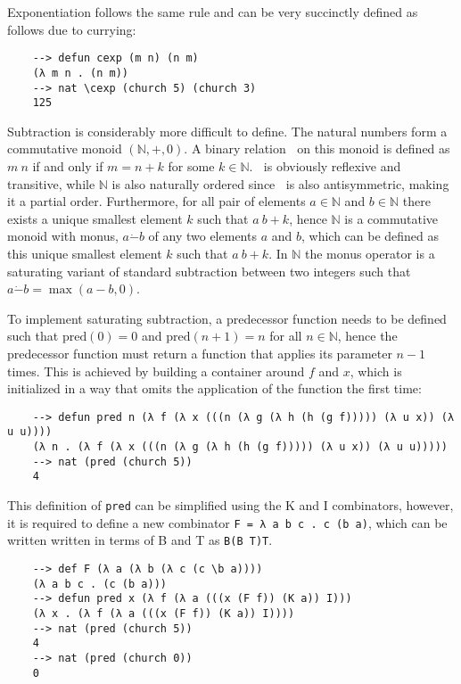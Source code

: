 Exponentiation follows the same rule and can be very succinctly defined as follows due to currying:

\begin{Verbatim}
    --> defun cexp (m n) (n m)
    (λ m n . (n m))
    --> nat \cexp (church 5) (church 3)
    125
\end{Verbatim}

Subtraction is considerably more difficult to define. The natural numbers form a commutative monoid $(\mathbb{N}, +, 0)$. A binary relation $~$ on this monoid is defined as $m~n$ if and only if $m = n + k$ for some $k \in \mathbb{N}$. $~$ is obviously reflexive and transitive, while $\mathbb{N}$ is also naturally ordered since $~$ is also antisymmetric, making it a partial order. Furthermore, for all pair of elements $a \in \mathbb{N}$ and $b \in \mathbb{N}$ there exists a unique smallest element $k$ such that $a ~ b + k$, hence $\mathbb{N}$ is a commutative monoid with monus, $a \dot - b$ of any two elements $a$ and $b$, which can be defined as this unique smallest element $k$ such that $a ~ b + k$. In $\mathbb{N}$ the monus operator is a saturating variant of standard subtraction between two integers such that $a \dot - b = \max(a - b, 0)$. 

To implement saturating subtraction, a predecessor function needs to be defined such that $\text{pred}(0) = 0$ and $\text{pred}(n + 1) = n$ for all $n \in \mathbb{N}$, hence the predecessor function must return a function that applies its parameter $n - 1$ times. This is achieved by building a container around $f$ and $x$, which is initialized in a way that omits the application of the function the first time:

\begin{Verbatim}
    --> defun pred n (λ f (λ x (((n (λ g (λ h (h (g f))))) (λ u x)) (λ u u))))
    (λ n . (λ f (λ x (((n (λ g (λ h (h (g f))))) (λ u x)) (λ u u)))))
    --> nat (pred (church 5))
    4
\end{Verbatim}

This definition of \verb|pred| can be simplified using the K and I combinators, however, it is required to define a new combinator \verb|F = λ a b c . c (b a)|, which can be written written in terms of B and T as \verb|B(B T)T|.

\begin{Verbatim}
    --> def F (λ a (λ b (λ c (c \b a))))
    (λ a b c . (c (b a)))
    --> defun pred x (λ f (λ a (((x (F f)) (K a)) I)))
    (λ x . (λ f (λ a (((x (F f)) (K a)) I))))
    --> nat (pred (church 5))
    4
    --> nat (pred (church 0))
    0
\end{Verbatim}

